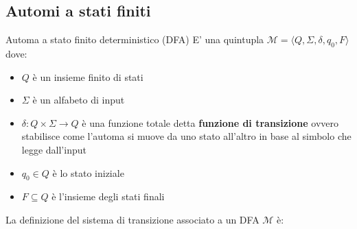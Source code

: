 \documentclass[12pt, a4paper]{report}
\begin{document}
            \subsection{Automi a stati finiti}
                \begin{definitionbox}{Automa a stato finito deterministico (DFA)}{}
                    E' una quintupla $\mathcal{M}=\langle Q,\Sigma, \delta, q_0, F\rangle$ dove:
                    \begin{itemize}
                        \item $Q$ è un insieme finito di stati
                        \item $\Sigma$ è un alfabeto di input
                        \item $\delta:Q\times\Sigma\rightarrow Q$ è una funzione totale detta \textbf{funzione di transizione} ovvero stabilisce come l'automa si muove da uno stato all'altro in base al simbolo che legge dall'input
                        \item $q_0\in Q$ è lo stato iniziale
                        \item $F\subseteq Q$ è l'insieme degli stati finali
                    \end{itemize}
                \end{definitionbox}
                La definizione del sistema di transizione associato a un DFA $\mathcal{M}$ è:
\end{document}

